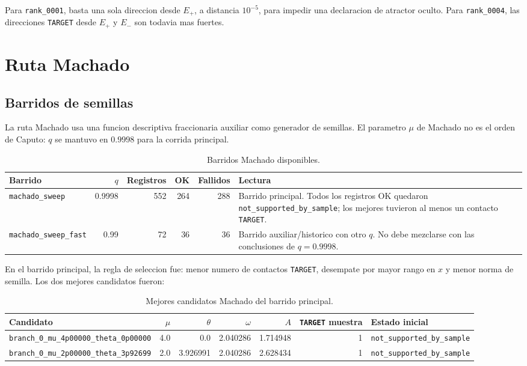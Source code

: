 \documentclass[11pt]{article}
\newcommand{\status}[1]{\texttt{\small #1}}
\newcommand{\target}{\texttt{TARGET}}
\newcommand{\qmain}{0.9998}
\newcommand{\Eplus}{E_+}
\newcommand{\Eminus}{E_-}
\begin{document}
Para \status{rank\_0001}, basta una sola direccion desde \(\Eplus\), a
distancia \(10^{-5}\), para impedir una declaracion de atractor oculto. Para
\status{rank\_0004}, las direcciones \target{} desde \(\Eplus\) y \(\Eminus\)
son todavia mas fuertes.

\section{Ruta Machado}

\subsection{Barridos de semillas}

La ruta Machado usa una funcion descriptiva fraccionaria auxiliar como
generador de semillas. El parametro \(\mu\) de Machado no es el orden de
Caputo: \(q\) se mantuvo en \(\qmain\) para la corrida principal.

\begin{table}[h]
\centering
\caption{Barridos Machado disponibles.}
\small
\begin{tabularx}{\textwidth}{lrrrrX}
\toprule
Barrido & \(q\) & Registros & OK & Fallidos & Lectura \\
\midrule
\status{machado\_sweep} & 0.9998 & 552 & 264 & 288 &
Barrido principal. Todos los registros OK quedaron
\status{not\_supported\_by\_sample}; los mejores tuvieron al menos un contacto
\target{}. \\
\status{machado\_sweep\_fast} & 0.99 & 72 & 36 & 36 &
Barrido auxiliar/historico con otro \(q\). No debe mezclarse con las
conclusiones de \(q=0.9998\). \\
\bottomrule
\end{tabularx}
\end{table}

En el barrido principal, la regla de seleccion fue: menor numero de contactos
\target{}, desempate por mayor rango en \(x\) y menor norma de semilla. Los dos
mejores candidatos fueron:

\begin{table}[h]
\centering
\caption{Mejores candidatos Machado del barrido principal.}
\small
\begin{tabular}{lrrrrrl}
\toprule
Candidato & \(\mu\) & \(\theta\) & \(\omega\) & \(A\) & \target{} muestra & Estado inicial \\
\midrule
\status{branch\_0\_mu\_4p00000\_theta\_0p00000}
& 4.0 & 0.0 & 2.040286 & 1.714948 & 1 & \status{not\_supported\_by\_sample} \\
\status{branch\_0\_mu\_2p00000\_theta\_3p92699}
& 2.0 & 3.926991 & 2.040286 & 2.628434 & 1 & \status{not\_supported\_by\_sample} \\
\bottomrule
\end{tabular}
\end{table}
\end{document}
